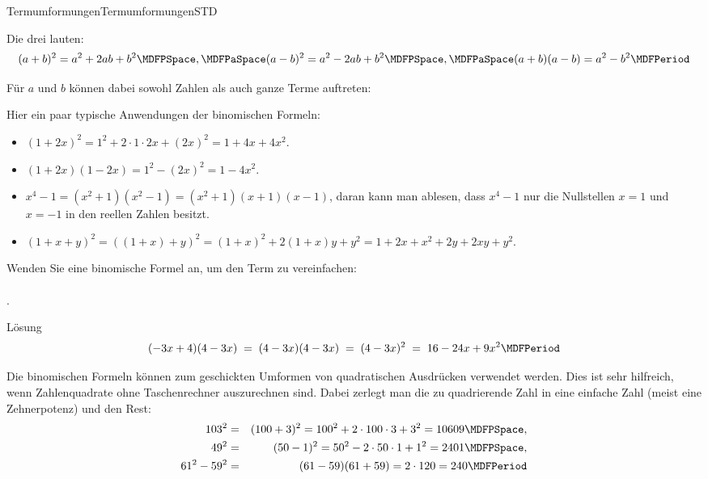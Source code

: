 \begin{MXContent}{Termumformungen}{Termumformungen}{STD}
\begin{MInfo}
Die drei  lauten:
$$ (a+b)^2 = a^2+2a b+b^2 \MDFPSpace, \MDFPaSpace (a-b)^2 = a^2-2a b+b^2 \MDFPSpace,\MDFPaSpace (a+b)(a-b) = a^2-b^2 \MDFPeriod $$
\end{MInfo}


Für $a$ und $b$ können dabei sowohl Zahlen als auch ganze Terme auftreten:

\begin{MExample}
Hier ein paar typische Anwendungen der binomischen Formeln:
\begin{itemize}
\item{$(1+2x)^2=1^2+2\cdot1\cdot 2x+(2x)^2=1+4x+4x^2$.}
\item{$(1+2x)(1-2x)=1^2-(2x)^2=1-4x^2$.}
\item{$x^4-1=(x^2+1)(x^2-1)=(x^2+1)(x+1)(x-1)$, daran kann man ablesen, dass $x^4-1$ nur die Nullstellen $x=1$ und $x=-1$ in den reellen Zahlen besitzt.}
\item{$(1+x+y)^2=\left({(1+x)+y}\right)^2= (1+x)^2+2(1+x)y+y^2=1+2x+x^2+2y+2x y+y^2$.}
\end{itemize}
\end{MExample}

\begin{MExercise}
Wenden Sie eine binomische Formel an, um den Term zu vereinfachen:\ \\ \ \\
.

\begin{MHint}{Lösung}$$(-3x+4)(4-3x)\;=\; (4-3x)(4-3x)\;=\; (4-3x)^2\;=\; 16-24x+9x^2 \MDFPeriod $$\end{MHint}%
\end{MExercise}

\begin{MExample}
Die binomischen Formeln können zum geschickten Umformen von quadratischen Ausdrücken verwendet werden.
Dies ist sehr hilfreich, wenn Zahlenquadrate ohne Taschenrechner auszurechnen sind. Dabei zerlegt man
die zu quadrierende Zahl in eine einfache Zahl (meist eine Zehnerpotenz) und den Rest:
\begin{eqnarray*}
103^2 & = & (100+3)^2 = 100^2+2\cdot 100\cdot 3+3^2 = 10609 \MDFPSpace,\\
49^2 & = & (50-1)^2 = 50^2-2\cdot 50\cdot 1 +1^2 = 2401 \MDFPSpace,\\
61^2-59^2 & = & (61-59)(61+59) = 2\cdot 120 = 240 \MDFPeriod
\end{eqnarray*}
\end{MExample}


\end{MXContent}
